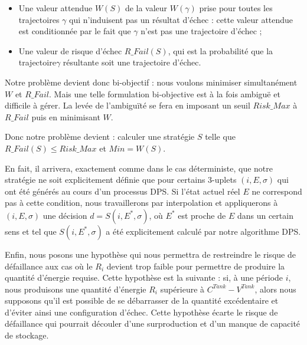 {  \begin{itemize}[label=$\square$]		
 \item Une valeur attendue $W(S)$ de la valeur $W(\gamma)$ prise pour toutes les trajectoires $\gamma$ qui n'induisent pas un résultat d'échec : cette valeur attendue est conditionnée par le fait que $\gamma$ n'est pas une trajectoire d'échec ;
 
 \item Une valeur de risque d'échec $R\_Fail(S)$, qui est la probabilité que la trajectoire$\gamma$ résultante soit une trajectoire d'échec.
\end{itemize}
Notre problème devient donc bi-objectif : nous voulons minimiser simultanément $W$ et $R\_Fail$.  Mais une telle formulation bi-objective est à la fois ambiguë et difficile à gérer. La levée de l'ambiguïté se fera en imposant un seuil $Risk\_Max$ à $R\_Fail$ puis en minimisant $W$.  

Donc notre problème devient : calculer une stratégie $S$ telle que $R\_Fail(S) \leq  Risk\_Max$ et $Min = W(S)$.

En fait, il arrivera, exactement comme dans le cas déterministe, que notre stratégie ne soit explicitement définie que pour certains 3-uplets $(i, E, \sigma)$ qui ont été générés au cours d'un processus DPS. Si l'état actuel réel $E$ ne correspond pas à cette condition, nous travaillerons par interpolation et appliquerons à $(i, E, \sigma)$ une décision $d = S(i, E^*, \sigma)$, où $E^*$ est proche de $E$ dans un certain sens et tel que $S(i, E^*,\sigma )$ a été explicitement calculé par notre algorithme DPS. 

Enfin, nous posons une hypothèse qui nous permettra de restreindre le risque de défaillance aux cas où le $R_i$ devient trop faible pour permettre de produire la quantité d'énergie requise. Cette hypothèse est la suivante : si, à une période $i$, nous produisons une quantité d'énergie $R_i$ supérieure à $C^{Tank} - V^{Tank}$, alors nous supposons qu'il est possible de se débarrasser de la quantité excédentaire et d'éviter ainsi une configuration d'échec. 
Cette hypothèse écarte le risque de défaillance qui pourrait découler d'une surproduction et d'un manque de capacité de stockage.   
}

